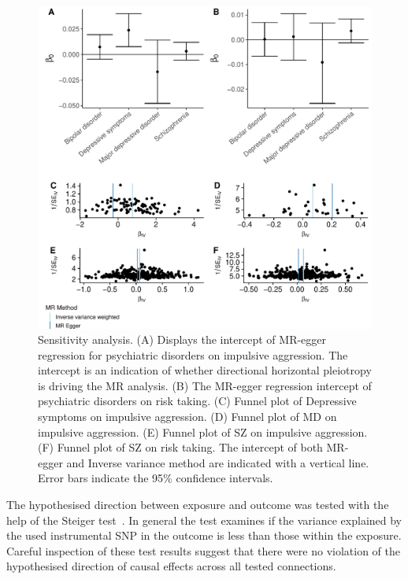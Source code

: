 \begin{figure}[htpb]
  \centering
  \includegraphics[width=0.9\linewidth]{figures/sensitvity_plot.pdf}
  \caption{Sensitivity analysis.
    (A) Displays the intercept of MR-egger regression for psychiatric disorders on impulsive aggression. The intercept is an indication of whether directional horizontal pleiotropy is driving the MR analysis.
    (B) The MR-egger regression intercept of psychiatric disorders on risk taking.
    (C) Funnel plot of Depressive symptoms on impulsive aggression. 
    (D) Funnel plot of MD on impulsive aggression. 
    (E) Funnel plot of SZ on impulsive aggression. 
    (F) Funnel plot of SZ on risk taking. 
    The intercept of both MR-egger and Inverse variance method are indicated with a vertical line.
    Error bars indicate the 95\% confidence intervals.
  }\label{fig:sensitivity}
\end{figure}

The hypothesised direction between exposure and outcome was tested with the help of the Steiger test~\cite{Steiger1980}.
In general the test examines if the variance explained by the used instrumental SNP in the outcome is less than those within the exposure. 
Careful inspection of these test results suggest that there were no violation of the hypothesised direction of causal effects across all tested connections.

